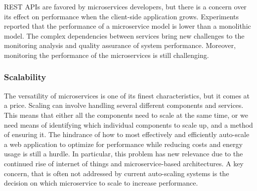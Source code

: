 REST APIs are favored by microservices developers, but there is a concern over its effect on performance when the client-side application grows.\cite{Ghebremicael2017} Experiments reported that the performance of a microservice model is lower than a monolithic model.\cite{Johansson2019} The complex dependencies between services bring new challenges to the monitoring analysis and quality assurance of system performance.\cite{Zhihui2020} Moreover, monitoring the performance of the microservices is still challenging.\cite{Saman2017, Venugopal2017}



\subsubsection{Scalability}%

The versatility of microservices is one of its finest characteristics, but it comes at a price. Scaling can involve handling several different components and services. This means that either all the components need to scale at the same time, or we need means of identifying which individual components to scale up, and a method of ensuring it.\cite{Meshenberg2016}
%
The hindrance of how to most effectively and efficiently auto-scale a web application to optimize for performance while reducing costs and energy usage is still a hurdle. In particular, this problem has new relevance due to the continued rise of internet of things and microservice-based architectures. A key concern, that is often not addressed by current auto-scaling systems is the decision on which microservice to scale to increase performance.\cite{coulson2020}

